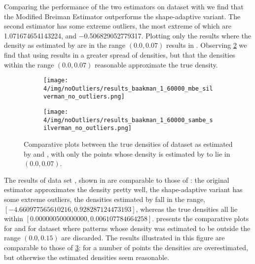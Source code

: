 		Comparing the performance of the two estimators on dataset \numberstringnum{\baakmanOneNum} with  we find that the Modified Breiman Estimator outperforms the shape-adaptive variant. The second estimator has some extreme outliers, the most extreme of which are \num{1.071674654143224}, and \num{-0.506829052779317}. 
		Plotting only the results where the density as estimated by \sambe are in the range $\left(\num{0.0}, \num[round-precision=1]{0.07} \right)$ results in . Observing \cref{fig:results:baakman1::noOUtliers:sambe} we find that using \sambe results in a greater spread of densities, but that the densities within the range $\left(\num[round-precision=1]{0.0}, \num[round-precision=1]{0.07} \right)$ reasonable approximate the true density.
		\begin{figure}[!ht]
			\centering
			\begin{subfigure}{0.6\columnwidth}
				\centering
				\texttt{[image: 4/img/noOutliers/results\_baakman\_1\_60000\_mbe\_silverman\_no\_outliers.png]}
				\caption{\mbe}
				\label{fig:results:baakman1:noOutliers:mbe}
			\end{subfigure}
			\begin{subfigure}{0.6\columnwidth}
				\centering
				\texttt{[image: 4/img/noOutliers/results\_baakman\_1\_60000\_sambe\_silverman\_no\_outliers.png]}
				\caption{\sambe}
				\label{fig:results:baakman1::noOUtliers:sambe}
			\end{subfigure}	
			\caption{Comparative plots between the true densities of dataset \baakmanOne as estimated by  \mbe and  \sambe, with only the points whose density is estimated by \sambe to lie in $\left(\num{0.0}, \num[round-precision=1]{0.07} \right)$.}
			\label{fig:results:baakman1:noOutliers}
		\end{figure}

		The results of data set \numberstringnum{\baakmanFourNum}, shown in  are comparable to those of \numberstringnum{\baakmanOneNum}: the original estimator approximates the density pretty well, the shape-adaptive variant has some extreme outliers, the densities estimated by \sambe fall in the range, $\left[\num{-4.660977565610216}, \num{0.928287124473193}\right]$, whereas the true densities all lie within $\left[\num{0.000000500000000}, \num{0.006107784664258}\right]$.
		 presents the comparative plots for \mbe and \sambe for dataset \baakmanFour where patterns whose density was estimated to be outside the range $\left(\num{0.0}, \num[round-precision=2]{0.15} \right)$ are discarded. The results illustrated in this figure are comparable to those of \cref{fig:results:baakman1:noOutliers}: for a number of points the densities are overestimated, but otherwise the estimated densities seem reasonable.	

